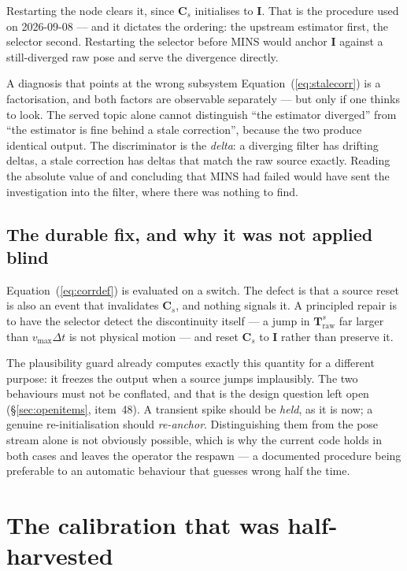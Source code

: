 Restarting the node clears it, since $\mathbf{C}_s$ initialises to
$\mathbf{I}$. That is the procedure used on 2026-09-08 --- and it dictates
the ordering: the upstream estimator first, the selector second. Restarting
the selector before MINS would anchor $\mathbf{I}$ against a still-diverged
raw pose and serve the divergence directly.

\begin{trapbox}{A diagnosis that points at the wrong subsystem}
Equation~(\ref{eq:stalecorr}) is a factorisation, and both factors are
observable separately --- but only if one thinks to look. The served topic
alone cannot distinguish ``the estimator diverged'' from ``the estimator is
fine behind a stale correction'', because the two produce identical output.
The discriminator is the \emph{delta}: a diverging filter has drifting
deltas, a stale correction has deltas that match the raw source exactly.
Reading the absolute value of  and concluding that
MINS had failed would have sent the investigation into the filter, where
there was nothing to find.
\end{trapbox}

\subsection{The durable fix, and why it was not applied blind}

Equation~(\ref{eq:corrdef}) is evaluated on a switch. The defect is that a
source reset is also an event that invalidates $\mathbf{C}_s$, and nothing
signals it. A principled repair is to have the selector detect the
discontinuity itself --- a jump in $\mathbf{T}^{s}_{\text{raw}}$ far larger
than $v_{\max}\Delta t$ is not physical motion --- and reset $\mathbf{C}_s$
to $\mathbf{I}$ rather than preserve it.

The plausibility guard already computes exactly this quantity for a
different purpose: it freezes the output when a source jumps implausibly.
The two behaviours must not be conflated, and that is the design question
left open (\S\ref{sec:openitems}, item~48). A transient spike should be
\emph{held}, as it is now; a genuine re-initialisation should
\emph{re-anchor}. Distinguishing them from the pose stream alone is not
obviously possible, which is why the current code holds in both cases and
leaves the operator the respawn --- a documented procedure being preferable
to an automatic behaviour that guesses wrong half the time.

\section{The calibration that was half-harvested}
\label{sec:demicalib}

